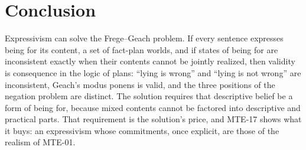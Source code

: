 \documentclass{situationist-preprint}
\begin{document}
\section{Conclusion}

Expressivism can solve the Frege--Geach problem. If every sentence expresses being for its content, a set of fact-plan worlds, and if states of being for are inconsistent exactly when their contents cannot be jointly realized, then validity is consequence in the logic of plans: \enquote{lying is wrong} and \enquote{lying is not wrong} are inconsistent, Geach's modus ponens is valid, and the three positions of the negation problem are distinct. The solution requires that descriptive belief be a form of being for, because mixed contents cannot be factored into descriptive and practical parts. That requirement is the solution's price, and MTE-17 shows what it buys: an expressivism whose commitments, once explicit, are those of the realism of MTE-01.
\end{document}
